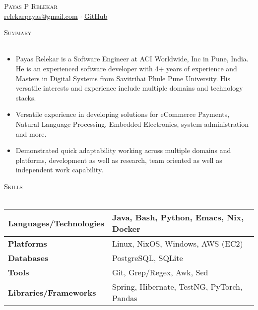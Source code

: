 \documentclass[a4paper]{article}
\newcommand{\lineunder} {
    \vspace*{-8pt} \\
    \hspace*{-18pt} \hrulefill \\
}
\newcommand{\header} [1] {
    {\hspace*{-18pt}\vspace*{6pt} \textsc{#1}}
    \vspace*{-6pt} \lineunder
}
\begin{document}
\vspace*{-40pt}

\vspace*{-10pt}
\begin{center}
  {\Huge \scshape {Payas P Relekar}}\\
  \href{mailto:relekarpayas@gmail.com}{relekarpayas@gmail.com} $\cdot$ \href{https://github.com/bhankas/}{GitHub}\\
\end{center}

\header{Summary}
\vspace{1mm}

\begin{itemize} \itemsep 1pt
  \item Payas Relekar is a Software Engineer at ACI Worldwide, Inc in Pune, India. He is an experienced software developer with 4+ years of experience and Masters in Digital Systems from Savitribai Phule Pune University. His versatile interests and experience include multiple domains and technology stacks.
  \item Versatile experience in developing solutions for eCommerce Payments, Natural Language Processing, Embedded Electronics, system administration and more.
  \item Demonstrated quick adaptability working across multiple domains and platforms, development as well as research, team oriented as well as independent work capability.
\end{itemize}

\header{Skills}
\vspace{1mm}
\bgroup
\setlength{\arrayrulewidth}{0.2mm}
\def\arraystretch{1.2}
\begin{tabularx}{\textwidth}{ | X | X | }
  \hline
  \textbf{Languages/Technologies} & Java, Bash, Python, Emacs, Nix, Docker        \\
  \hline
  \textbf{Platforms}             & Linux, NixOS, Windows, AWS (EC2)          \\
  \hline
  \textbf{Databases}             & PostgreSQL, SQLite          \\
  \hline
  \textbf{Tools}                 & Git, Grep/Regex, Awk, Sed            \\
  \hline
  \textbf{Libraries/Frameworks}  & Spring, Hibernate, TestNG, PyTorch, Pandas \\
  \hline
\end{tabularx}
\egroup
\vspace{2mm}
\end{document}
